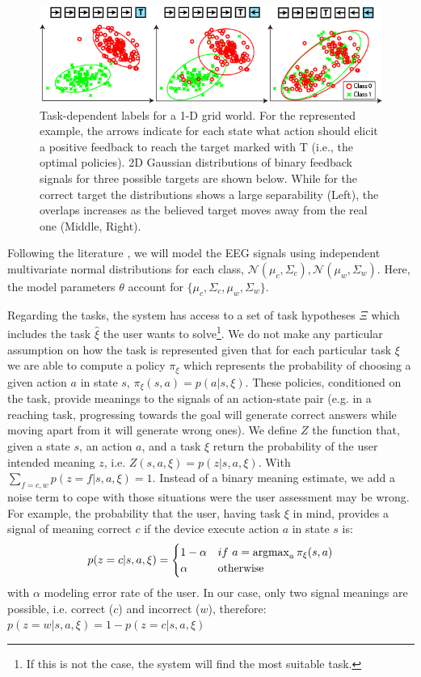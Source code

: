 \documentclass[conference]{IEEEtran}
\newcommand{\argmax}{\operatornamewithlimits{argmax}}
\begin{document}
\begin{figure}[!h]%
\centering
\includegraphics[width=1\columnwidth]{images/real_vs_fake}
\caption{Task-dependent labels for a 1-D grid world.  For the represented example, the arrows indicate for each state what action should elicit a positive feedback to reach the target marked with T (i.e., the optimal policies). 2D Gaussian distributions of binary feedback signals for three possible targets are shown below. While for the correct target the distributions shows a large separability (Left), the overlaps increases as the believed target moves away from the real one (Middle, Right). }
\label{fig:GM}
\end{figure}


Following the literature \cite{blankertz2010single}, we will model the EEG signals using independent multivariate normal distributions for each class, $\mathcal{N}(\mu_c, \Sigma_c), \mathcal{N}(\mu_w, \Sigma_w)$. Here, the model parameters $\theta$ account for $\{\mu_c, \Sigma_c,\mu_w, \Sigma_w\}$. 

Regarding the tasks, the system has access to a set of task hypotheses $\Xi$ which includes the task  $\hat{\xi}$ the user wants to solve\footnote{If this is not the case, the system will find the most suitable task.}. We do not make any particular assumption on how the task is represented given that for each particular task $\xi$ we are able to compute a policy $\pi_{\xi}$ which represents the probability of choosing a given action $a$ in state $s$, $\pi_{\xi}(s,a) = p(a|s,\xi)$. These policies, conditioned on the task, provide meanings to the signals of an action-state pair (e.g. in a reaching task, progressing towards the goal will generate correct answers while moving apart from it will generate wrong ones). We define $Z$ the function that, given a state $s$, an action $a$, and a task $\xi$ return the probability of the user intended meaning $z$, i.e. $Z(s,a,\xi) = p(z|s,a,\xi)$. With $\sum_{f=c,w} p(z=f|s,a,\xi) = 1$. Instead of a binary meaning estimate, we add a noise term to cope with those situations were the user assessment may be wrong.  For example, the probability that the user, having task $\xi$ in mind, provides a signal of meaning correct $c$ if the device execute action $a$ in state $s$ is:
%
\begin{equation*}
    	p(z=c|s,a,\xi) =
     	\begin{cases}
		1-\alpha          & if~a = \argmax_a \pi_{\xi}(s,a)\\
		\alpha             & \text{otherwise}\\
	\end{cases}
\end{equation*}
with $\alpha$ modeling error rate of the user. In our case, only two signal meanings are possible, i.e. correct ($c$) and incorrect ($w$), therefore: $p(z=w|s,a,\xi) = 1- p(z=c|s,a,\xi)$
\end{document}
